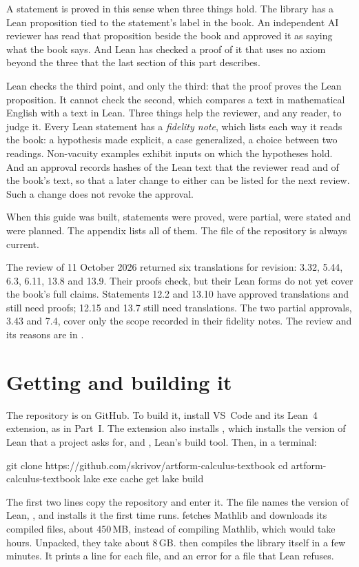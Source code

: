 A statement is proved in this sense when three things hold. The library has
a Lean proposition tied to the statement's label in the book. An independent
AI reviewer has
read that proposition beside the book and approved it as saying what the
book says. And Lean has checked a proof of it that uses no axiom beyond
the three that the last section of this part describes.

Lean checks the third point, and only the third: that the proof proves the
Lean proposition. It cannot check the second, which compares a text in
mathematical English with a text in Lean. Three things help the reviewer, and
any reader, to judge it. Every Lean statement has a \emph{fidelity note},
which lists each way it reads the book: a hypothesis made explicit, a case
generalized, a choice between two readings. Non-vacuity examples exhibit
inputs on which the hypotheses hold. And an approval records hashes of the
Lean text that the reviewer read and of the book's text, so that a later
change to either can be listed for the next review. Such a change does not
revoke the approval.

When this guide was built,  statements were proved,
 were partial,  were stated and
 were planned.
The appendix lists all of them. The file  of the
repository is always current.

The review of 11 October 2026 returned six translations for revision:
3.32, 5.44, 6.3, 6.11, 13.8 and 13.9. Their proofs check, but their Lean
forms do not yet cover the book's full claims. Statements 12.2 and 13.10
have approved translations and still need proofs; 12.15 and 13.7 still need
translations. The two partial approvals, 3.43 and 7.4, cover only the scope
recorded in their fidelity notes. The review and its reasons are in
.

\section*{Getting and building it}

The repository is on GitHub. To build it, install VS~Code and its Lean~4
extension, as in Part~I. The extension also installs , which
installs the version of Lean that a project asks for, and ,
Lean's build tool. Then, in a terminal:
\begin{shellcommands}
git clone https://github.com/skrivov/artform-calculus-textbook
cd artform-calculus-textbook
lake exe cache get
lake build
\end{shellcommands}
The first two lines copy the repository and enter it. The file
 names the version of Lean, \leanversion, and 
installs it the first time  runs.  fetches
Mathlib and downloads its compiled files, about 450\,MB, instead of
compiling Mathlib, which would take hours. Unpacked, they take about 8\,GB.
 then compiles the library itself in a few minutes. It
prints a line for each file, and an error for a file that Lean refuses.

